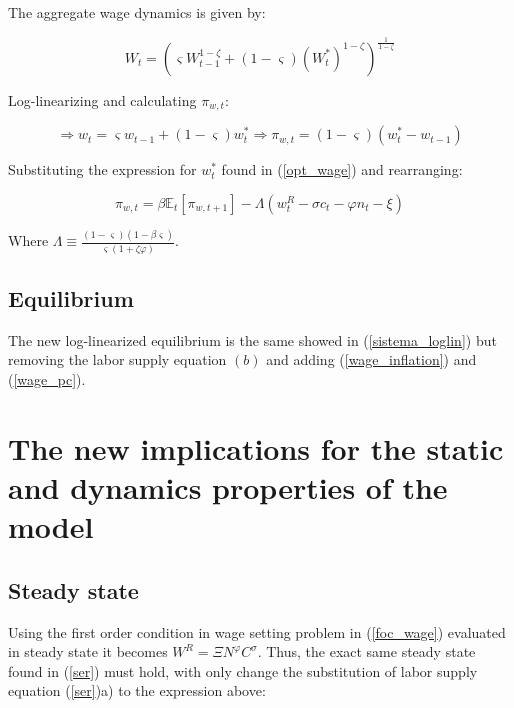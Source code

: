 \documentclass{article}
\newcommand{\Et}{\mathbb{E}_t}
\begin{document}
The aggregate wage dynamics is given by:

\begin{equation}
    W_t = \left(\varsigma W_{t-1}^{1-\zeta} + (1-\varsigma) (W_t^*)^{1-\zeta} \right)^{\frac{1}{1-\zeta}}
\end{equation}

Log-linearizing and calculating $\pi_{w,t}$:

\begin{equation}
    \Rightarrow w_t = \varsigma w_{t-1} + (1-\varsigma) w_t^* \Rightarrow \pi_{w,t} = (1-\varsigma)(w_t^* - w_{t-1})
\end{equation}

Substituting the expression for $w_t^*$ found in (\ref{opt_wage}) and rearranging:

\begin{equation}
    \label{wage_pc}
    \pi_{w,t} = \beta \Et[\pi_{w,t+1}] - \Lambda (w_t^R  - \sigma c_t - \varphi n_t - \xi)
\end{equation}

Where $\Lambda \equiv \frac{(1-\varsigma)(1- \beta \varsigma)}{\varsigma(1+ \zeta \varphi)}$.

\subsection{Equilibrium}
The new log-linearized equilibrium is the same showed in (\ref{sistema_loglin}) but removing the labor supply equation $(b)$ and adding (\ref{wage_inflation}) and (\ref{wage_pc}).

\section{The new implications for the static and dynamics properties of the model}

\subsection{Steady state}
Using the first order condition in wage setting problem in (\ref{foc_wage}) evaluated in steady state it becomes $W^R = \Xi N^\varphi C^\sigma$. Thus, the exact same steady state found in (\ref{ser}) must hold, with only change the substitution of labor supply equation (\ref{ser})a) to the expression above:
\end{document}
